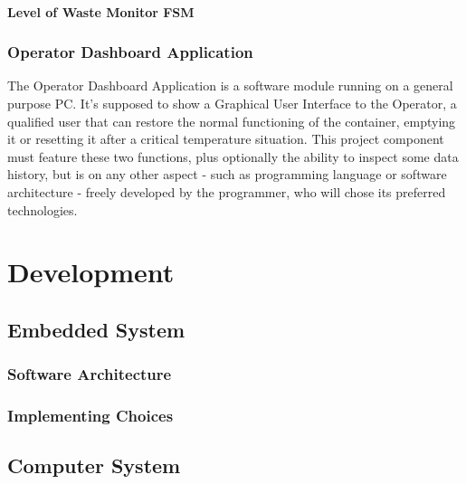 \documentclass[a4paper,12pt]{report}
\begin{document}
	\subsubsection{Level of Waste Monitor FSM}
	
	\subsection{Operator Dashboard Application}
	The Operator Dashboard Application is a software module running on a general purpose PC. It's supposed to show a Graphical User Interface to the Operator, a qualified user that can restore the normal functioning of the container, emptying it or resetting it after a critical temperature situation.\newline
	This project component must feature these two functions, plus optionally the ability to inspect some data history, but is on any other aspect - such as programming language or software architecture - freely developed by the programmer, who will chose its preferred technologies.
	
	\chapter{Development}
	
	\section{Embedded System}
	
	\subsection{Software Architecture}
	
	\subsection{Implementing Choices}
	
	\section{Computer System}
	
\end{document}
